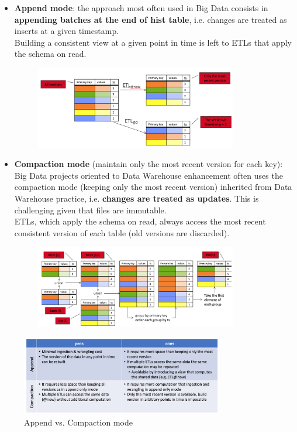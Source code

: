 \documentclass[10pt,a4paper]{article}
\begin{document}
\begin{itemize}
	\item \textbf{Append mode}: the approach most often used in Big Data consists in \textbf{appending batches at the end of hist table}, i.e. changes are treated as inserts at a given timestamp. \\ Building a consistent view at a given point in time is left to ETLs that apply the schema on read. 
	\begin{figure}[ht!]
 \hfill \includegraphics[width=250pt]{images/batch-append.png}\hspace*{\fill}
\end{figure}  	
	
	\item \textbf{Compaction mode} (maintain only the most recent version for each key): Big Data projects oriented to Data Warehouse enhancement often uses the compaction mode (keeping only the most recent version) inherited from Data Warehouse practice, i.e. \textbf{changes are treated as updates}. This is challenging given that files are immutable. \\ ETLs, which apply the schema on read, always access the most recent consistent version of each table (old versions are discarded).
	\begin{figure}[ht!]
 \hfill \includegraphics[width=250pt]{images/batch-compaction.png}\hspace*{\fill}
\end{figure}  

\end{itemize}

\begin{figure}[ht!]
 \hfill \includegraphics[width=250pt]{images/append-vs-compaction.png}\hspace*{\fill}
 \caption{Append vs. Compaction mode}
\end{figure}  
\end{document}

